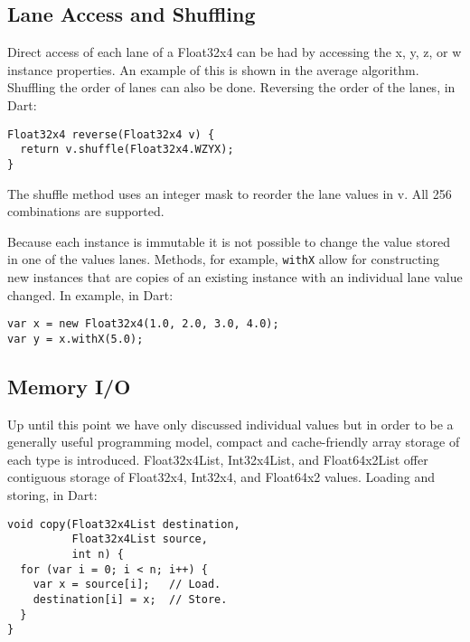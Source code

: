 \documentclass[preprint]{sigplanconf}
\begin{document}
\subsection{Lane Access and Shuffling}

Direct access of each lane of a Float32x4 can be had by accessing the x, y, z,
or w instance properties. An example of this is shown in the average algorithm.
Shuffling the order of lanes can also be done. Reversing the order of the lanes,
in Dart:

\begin{small}
\begin{lstlisting}
Float32x4 reverse(Float32x4 v) {
  return v.shuffle(Float32x4.WZYX);
}
\end{lstlisting}
\end{small}

The shuffle method uses an integer mask to reorder the lane values in v. All 256
combinations are supported.

Because each instance is immutable it is not possible to change the value stored
in one of the values lanes. Methods, for example, \verb!withX! allow for
constructing new instances that are copies of an existing instance with an
individual lane value changed. In example, in Dart:

\begin{small}
\begin{lstlisting}
var x = new Float32x4(1.0, 2.0, 3.0, 4.0);
var y = x.withX(5.0);
\end{lstlisting}
\end{small}

\subsection{Memory I/O}

Up until this point we have only discussed individual values but in order to be
a generally useful programming model, compact and cache-friendly array storage
of each type is introduced. Float32x4List, Int32x4List, and Float64x2List offer
contiguous storage of Float32x4, Int32x4, and Float64x2 values. Loading and
storing, in Dart:

\begin{small}
\begin{lstlisting}
void copy(Float32x4List destination,
          Float32x4List source,
          int n) {
  for (var i = 0; i < n; i++) {
    var x = source[i];   // Load.
    destination[i] = x;  // Store.
  }
}
\end{lstlisting}
\end{small}
\end{document}
